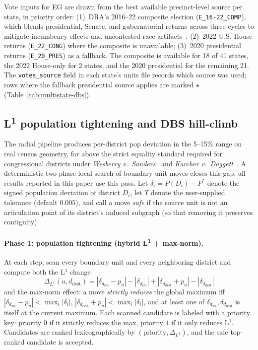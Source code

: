 Vote inputs for EG are drawn from the best available precinct-level
source per state, in priority order: (1)~DRA's 2016--22 composite
election (\texttt{E\_16-22\_COMP}), which blends presidential, Senate,
and gubernatorial returns across three cycles to mitigate incumbency
effects and uncontested-race artifacts~\cite{dra2020vtd}; (2)~2022
U.S. House returns (\texttt{E\_22\_CONG}) where the composite is
unavailable; (3)~2020 presidential returns (\texttt{E\_20\_PRES}) as a
fallback. The composite is available for 18 of 41 states, the 2022
House-only for 2 states, and the 2020 presidential for the remaining
21. The \texttt{votes\_source} field in each state's units file records
which source was used; rows where the fallback presidential source
applies are marked $\star$ (Table~\ref{tab:multistate-dbs}).

\subsection{\texorpdfstring{L\textsuperscript{1}}{L1} population tightening and DBS hill-climb}
\label{sec:methods-tighten}
\label{sec:methods-optimize}

The radial pipeline produces per-district pop deviation in the
5--15\% range on real census geometry, far above the strict equality
standard required for congressional districts under \textit{Wesberry
v.~Sanders}~\cite{wesberry1964} and \textit{Karcher
v.~Daggett}~\cite{karcher1983}. A deterministic two-phase local
search of boundary-unit moves closes this gap; all results reported
in this paper use this pass. Let
$\delta_i = P(D_i) - P^{*}$ denote the signed population deviation of
district $D_i$, let $T$ denote the user-supplied tolerance (default
$0.005$), and call a move \emph{safe} if the source unit is not an
articulation point of its district's induced subgraph (so that
removing it preserves contiguity).

\paragraph{Phase 1: population tightening (hybrid L\textsuperscript{1} + max-norm).}
At each step, scan every boundary unit and every neighboring district
and compute both the L$^1$ change
\[
  \Delta_{L^1}(u, d_{\mathrm{dest}}) =
    |\delta_{d_{\mathrm{src}}} - p_u| - |\delta_{d_{\mathrm{src}}}|
  + |\delta_{d_{\mathrm{dest}}} + p_u| - |\delta_{d_{\mathrm{dest}}}|
\]
and the max-norm effect: a move \emph{strictly reduces} the global
maximum iff $|\delta_{d_{\mathrm{src}}} - p_u| < \max_i |\delta_i|$,
$|\delta_{d_{\mathrm{dest}}} + p_u| < \max_i |\delta_i|$, and at least
one of $\delta_{d_{\mathrm{src}}}, \delta_{d_{\mathrm{dest}}}$ is
itself at the current maximum. Each scanned candidate is labeled with
a priority key: priority $0$ if it strictly reduces the max,
priority $1$ if it only reduces L$^1$. Candidates are ranked
lexicographically by $(\text{priority}, \Delta_{L^1})$, and the safe
top-ranked candidate is accepted.

